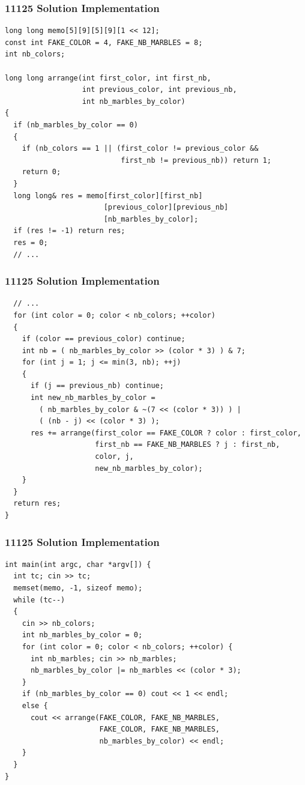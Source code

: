 \documentclass{beamer}
\begin{document}
\begin{frame}[fragile]
\frametitle{11125 Solution Implementation}

\scriptsize
\begin{lstlisting}
long long memo[5][9][5][9][1 << 12];
const int FAKE_COLOR = 4, FAKE_NB_MARBLES = 8;
int nb_colors;

long long arrange(int first_color, int first_nb,
                  int previous_color, int previous_nb,
                  int nb_marbles_by_color)
{
  if (nb_marbles_by_color == 0)
  {
    if (nb_colors == 1 || (first_color != previous_color &&
                           first_nb != previous_nb)) return 1;
    return 0;
  }
  long long& res = memo[first_color][first_nb]
                       [previous_color][previous_nb]
                       [nb_marbles_by_color];
  if (res != -1) return res;
  res = 0;
  // ...
\end{lstlisting}

\end{frame}

\begin{frame}[fragile]
\frametitle{11125 Solution Implementation}

\scriptsize
\begin{lstlisting}
  // ...
  for (int color = 0; color < nb_colors; ++color)
  {
    if (color == previous_color) continue;
    int nb = ( nb_marbles_by_color >> (color * 3) ) & 7;
    for (int j = 1; j <= min(3, nb); ++j)
    {
      if (j == previous_nb) continue;
      int new_nb_marbles_by_color =
        ( nb_marbles_by_color & ~(7 << (color * 3)) ) |
        ( (nb - j) << (color * 3) );
      res += arrange(first_color == FAKE_COLOR ? color : first_color,
                     first_nb == FAKE_NB_MARBLES ? j : first_nb,
                     color, j,
                     new_nb_marbles_by_color);
    }
  }
  return res;
}
\end{lstlisting}

\end{frame}

\begin{frame}[fragile]
\frametitle{11125 Solution Implementation}

\scriptsize
\begin{lstlisting}
int main(int argc, char *argv[]) {
  int tc; cin >> tc;
  memset(memo, -1, sizeof memo);
  while (tc--)
  {
    cin >> nb_colors;
    int nb_marbles_by_color = 0;
    for (int color = 0; color < nb_colors; ++color) {
      int nb_marbles; cin >> nb_marbles;
      nb_marbles_by_color |= nb_marbles << (color * 3);
    }
    if (nb_marbles_by_color == 0) cout << 1 << endl;
    else {
      cout << arrange(FAKE_COLOR, FAKE_NB_MARBLES,
                      FAKE_COLOR, FAKE_NB_MARBLES,
                      nb_marbles_by_color) << endl;
    }
  }
}
\end{lstlisting}

\end{frame}
\end{document}

